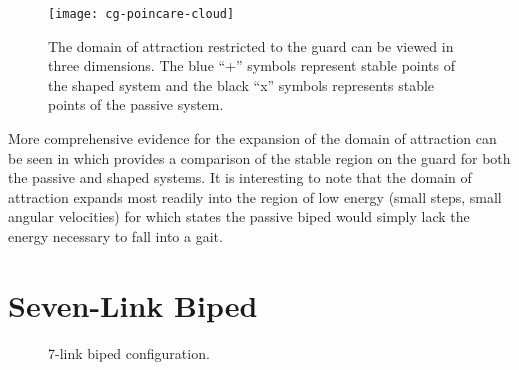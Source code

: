 \begin{figure}[t!]
  \centering
    \centering
    \texttt{[image: cg-poincare-cloud]}
    \caption{The domain of attraction restricted to the guard can be viewed in
      three dimensions.
      The blue ``+'' symbols represent stable points of the shaped system and the
      black ``x'' symbols represents stable points of the passive system.}
    \label{fig:point-cloud}
  \vspace{-1em}
\end{figure}

More comprehensive evidence for the expansion of the domain of attraction can be
seen in  which provides a comparison of the stable
region on the guard for both the passive and shaped systems.
%
It is interesting to note that the domain of attraction expands most readily
into the region of low energy (small steps, small angular velocities) for which
states the passive biped would simply lack the energy necessary to fall into a
gait.

\section{Seven-Link Biped}

\begin{figure}
  \centering
  \def\svgwidth{0.5\columnwidth}
  
  \caption{7-link biped configuration.}
\end{figure}
